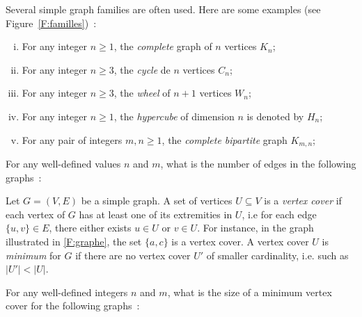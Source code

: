 \documentclass[12pt,addpoints]{exam}
\begin{document}
\begin{questions}
\question
Several simple graph families are often used. Here are some examples (see Figure~\ref{F:familles})~:
\label{graphdef}\begin{enumerate}[(i)]
  \item For any integer $n \geq 1$, the \emph{complete} graph of $n$ vertices $K_n$;
  \item For any integer $n \geq 3$, the \emph{cycle} de $n$ vertices $C_n$;
  \item For any integer $n \geq 3$, the \emph{wheel} of $n + 1$ vertices $W_n$;
  \item For any integer $n \geq 1$, the \emph{hypercube} of dimension $n$ is denoted by $H_n$;
  \item For any pair of integers $m,n \geq 1$, the \emph{complete bipartite} graph $K_{m,n}$;
\end{enumerate}
For any well-defined values $n$ and $m$, what is the number of edges in the following graphs~:

\question
Let $G = (V,E)$ be a simple graph. A set of vertices $U \subseteq V$ is a \emph{vertex cover} if each vertex of $G$ has at least one of its extremities in $U$, i.e for each edge $\{u,v\} \in E$, there either exists $u \in U$ or $v \in U$.
For instance, in the graph illustrated in \ref{F:graphe}, the set $\{a,c\}$ is a vertex cover. A vertex cover $U$ is \emph{minimum} for $G$ if there are no vertex cover $U'$ of smaller cardinality, i.e. such as $|U'| < |U|$.

For any well-defined integers $n$ and $m$, what is the size of a minimum vertex cover for the following graphs~:
\begin{parts}

\end{parts}
\end{questions}
\end{document}
